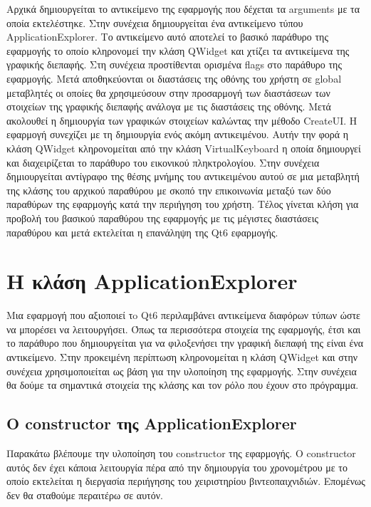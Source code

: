 Αρχικά δημιουργείται το αντικείμενο της εφαρμογής που δέχεται τα arguments με τα οποία εκτελέστηκε.
Στην συνέχεια δημιουργείται ένα αντικείμενο τύπου ApplicationExplorer. Το αντικείμενο αυτό αποτελεί
το βασικό παράθυρο της εφαρμογής το οποίο κληρονομεί την κλάση QWidget και χτίζει τα αντικείμενα της
γραφικής διεπαφής. Στη συνέχεια προστίθενται ορισμένα flags στο παράθυρο της εφαρμογής. Μετά αποθηκεύονται
οι διαστάσεις της οθόνης του χρήστη σε global μεταβλητές οι οποίες θα χρησιμεύσουν στην προσαρμογή των
διαστάσεων των στοιχείων της γραφικής διεπαφής ανάλογα με τις διαστάσεις της οθόνης. Μετά ακολουθεί η
δημιουργία των γραφικών στοιχείων καλώντας την μέθοδο CreateUI. Η εφαρμογή συνεχίζει με τη δημιουργία
ενός ακόμη αντικειμένου. Αυτήν την φορά η κλάση QWidget κληρονομείται από την κλάση VirtualKeyboard
η οποία δημιουργεί και διαχειρίζεται το παράθυρο του εικονικού πληκτρολογίου. Στην συνέχεια δημιουργείται
αντίγραφο της θέσης μνήμης του αντικειμένου αυτού σε μια μεταβλητή της κλάσης του αρχικού παραθύρου με
σκοπό την επικοινωνία μεταξύ των δύο παραθύρων της εφαρμογής κατά την περιήγηση του χρήστη. Τέλος γίνεται
κλήση για προβολή του βασικού παραθύρου της εφαρμογής με τις μέγιστες διαστάσεις παραθύρου και μετά
εκτελείται η επανάληψη της Qt6 εφαρμογής. 


\section{Η κλάση ApplicationExplorer}


Μια εφαρμογή που αξιοποιεί τo Qt6 περιλαμβάνει αντικείμενα διαφόρων τύπων ώστε να
μπορέσει να λειτουργήσει. Όπως τα περισσότερα στοιχεία της εφαρμογής, έτσι και το
παράθυρο που δημιουργείται για να φιλοξενήσει την γραφική διεπαφή της είναι ένα αντικείμενο. 
Στην προκειμένη περίπτωση κληρονομείται η κλάση QWidget και στην συνέχεια χρησιμοποιείται 
ως βάση για την υλοποίηση της εφαρμογής. Στην συνέχεια θα δούμε τα σημαντικά στοιχεία της
κλάσης και τον ρόλο που έχουν στο πρόγραμμα.





\subsection{Ο constructor της ApplicationExplorer}
Παρακάτω βλέπουμε την υλοποίηση του constructor της εφαρμογής. Ο constructor αυτός δεν
έχει κάποια λειτουργία πέρα από την δημιουργία του χρονομέτρου με το οποίο εκτελείται 
η διεργασία περιήγησης του χειριστηρίου βιντεοπαιχνιδιών. Επομένως δεν θα σταθούμε 
περαιτέρω σε αυτόν.

